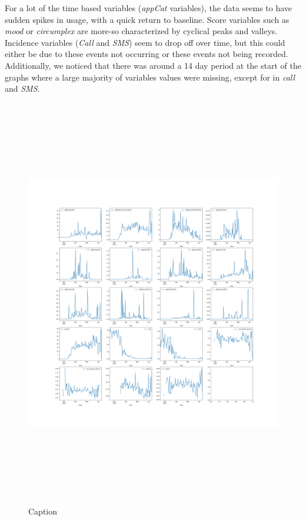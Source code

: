 \documentclass[runningheads]{llncs}
\begin{document}
For a lot of the time based variables (\textit{appCat} variables), the data seems to have sudden spikes in usage, with a quick return to baseline. Score variables such as \textit{mood} or \textit{circumplex} are more-so characterized by cyclical peaks and valleys. Incidence variables (\textit{Call} and \textit{SMS}) seem to drop off over time, but this could either be due to these events not occurring or these events not being recorded. \\

Additionally, we noticed that there was around a 14 day period at the start of the graphs where a large majority of variables values were missing, except for in \textit{call} and \textit{SMS}.

\begin{figure}[h!]
    \centering
    \includegraphics[width=18cm, height=18cm, trim={10cm 5cm 0 5cm}]{plots/plots_1a/time_plot.png}
    \caption{Caption}
    \label{fig:my_label}
\end{figure}
\end{document}
